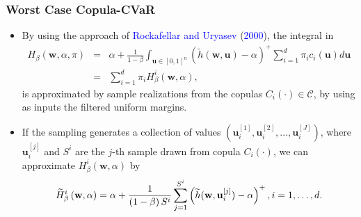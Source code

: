 \documentclass[pdf,10pt,xcolor=dvipsnames,hide notes]{beamer}
\begin{document}

\begin{frame}[label=frame3e]
	\frametitle{Worst Case Copula-CVaR}
	
	\begin{itemize}
		\justifying
		\setlength{\parskip}{15pt}
		
		
		\item By using the approach of \textcolor{blue}{Rockafellar and Uryasev} (\textcolor{blue}{2000}), the integral in 
		\begin{eqnarray*}
			H_{\beta }\left( \mathbf{w},\alpha ,\pi \right) &=&\alpha +\frac{1}{1-\beta }
			\int_{\mathbf{u}\in \left[ 0,1\right] ^{n}}\left( \widetilde{h}\left( \mathbf{w,u}
			\right) -\alpha \right) ^{+}\sum_{i=1}^{d}\pi _{i}c_{i}\left( \mathbf{u}
			\right) d\mathbf{u}\\
			&=&\sum_{i=1}^{d}\pi _{i}H_{\beta }^{i}\left( \mathbf{w},\alpha \right) ,
		\end{eqnarray*}
	is approximated by sample realizations from the copulas $%
		C_{i}\left( \cdot \right) \in \mathcal{C}$, by using as inputs the filtered
		uniform margins. 
		
		\item If the sampling generates a collection of values $\left(
		\mathbf{u}_{i}^{[1]},\mathbf{u}_{i}^{[2]},\ldots,\mathbf{u}_{i}^{[J]}\right) $,
		where $\mathbf{u}_{i}^{[j]}$ and $S^{i}$ are the $j$-th sample drawn from
		copula $C_{i}\left( \cdot \right) $, we can approximate $H_{\beta }^{i}\left( \mathbf{w},\alpha
		\right) $ by
		\begin{equation}
		\widetilde{H}_{\beta }^{i}\left( \mathbf{w},\alpha \right) =\alpha +\frac{1}{%
			\left( 1-\beta \right) S^{i}}\sum_{j=1}^{S^{i}}\left( \widetilde{h}(\mathbf{w},\mathbf{u}%
		_{i}^{[j]})-\alpha \right) ^{+},i=1,\ldots,d.
		\end{equation}%
		
				
	\end{itemize}
	
	
\end{frame}
\end{document}
